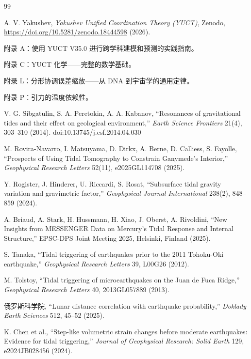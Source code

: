 \documentclass[12pt,a4paper]{article}
\theoremstyle{remark}
\begin{document}
	\begin{thebibliography}{99}
		
		A. V. Yakushev, \emph{Yakushev Unified Coordination Theory (YUCT)}, Zenodo, \url{https://doi.org/10.5281/zenodo.18444598} (2026).
		
		附录 A：使用 YUCT V35.0 进行跨学科建模和预测的实践指南。
		
		附录 C：YUCT 化学——完整的数学基础。
		
		附录 L：分形协调误差缩放——从 DNA 到宇宙学的通用定律。
		
		附录 P：引力的温度依赖性。
		
		V. G. Sibgatulin, S. A. Peretokin, A. A. Kabanov, “Resonances of gravitational tides and their effect on geological environment,” \emph{Earth Science Frontiers} 21(4), 303–310 (2014). doi:10.13745/j.esf.2014.04.030
		
		M. Rovira-Navarro, I. Matsuyama, D. Dirkx, A. Berne, D. Calliess, S. Fayolle, “Prospects of Using Tidal Tomography to Constrain Ganymede's Interior,” \emph{Geophysical Research Letters} 52(11), e2025GL114708 (2025).
		
		Y. Rogister, J. Hinderer, U. Riccardi, S. Rosat, “Subsurface tidal gravity variation and gravimetric factor,” \emph{Geophysical Journal International} 238(2), 848–859 (2024).
		
		A. Briaud, A. Stark, H. Hussmann, H. Xiao, J. Oberst, A. Rivoldini, “New Insights from MESSENGER Data on Mercury's Tidal Response and Internal Structure,” EPSC-DPS Joint Meeting 2025, Helsinki, Finland (2025).
		
		S. Tanaka, “Tidal triggering of earthquakes prior to the 2011 Tohoku-Oki earthquake,” \emph{Geophysical Research Letters} 39, L00G26 (2012).
		
		M. Tolstoy, “Tidal triggering of microearthquakes on the Juan de Fuca Ridge,” \emph{Geophysical Research Letters} 40, 2013GL057889 (2013).
		
		俄罗斯科学院, “Lunar distance correlation with earthquake probability,” \emph{Doklady Earth Sciences} 512, 45–52 (2025).
		
		K. Chen et al., “Step-like volumetric strain changes before moderate earthquakes: Evidence for tidal triggering,” \emph{Journal of Geophysical Research: Solid Earth} 129, e2024JB028456 (2024).
		

\end{thebibliography}
\end{document}
